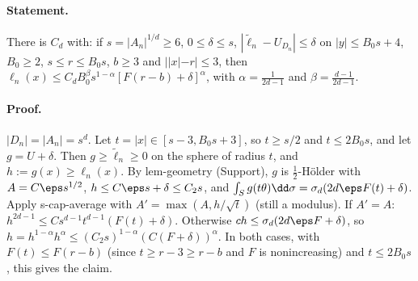 \paragraph{Statement.} There is $C_d$ with: if $s=|A_n|^{1/d}\geq6$, $0\leq\delta\leq s$, $|\widetilde\ell_n-U_{D_n}|\leq\delta$ on $|y|\leq B_0s+4$, $B_0\geq2$,
$s\leq r\leq B_0s$, $b\geq3$ and $||x|-r|\leq3$, then $\ell_n(x)\leq C_dB_0^\beta s^{1-\alpha}[F(r-b)+\delta]^\alpha$, with $\alpha=\frac1{2d-1}$ and $\beta=\frac{d-1}{2d-1}$.
\paragraph{Proof.} $|D_n|=|A_n|=s^d$. Let $t=|x|\in[s-3,B_0s+3]$, so $t\geq s/2$ and $t\leq2B_0s$, and let $g=U+\delta$. Then $g\geq\widetilde\ell_n\geq0$ on the sphere of
radius $t$, and $h:=g(x)\geq\ell_n(x)$. By lem-geometry (Support), $g$ is $\frac12$-Hölder with $A=C\eps s^{1/2}$, $h\leq C\eps s+\delta\leq C_2s$, and
$\int_Sg(t\theta)\dd\sigma=\sigma_d(2d\eps F(t)+\delta)$. Apply s-cap-average with $A'=\max(A,h/\sqrt t)$ (still a modulus). If $A'=A$:
$h^{2d-1}\leq C s^{d-1}t^{d-1}(F(t)+\delta)$. Otherwise $ch\leq\sigma_d(2d\eps F+\delta)$, so $h=h^{1-\alpha}h^\alpha\leq(C_2s)^{1-\alpha}(C(F+\delta))^\alpha$. In both
cases, with $F(t)\leq F(r-b)$ (since $t\geq r-3\geq r-b$ and $F$ is nonincreasing) and $t\leq2B_0s$, this gives the claim.

